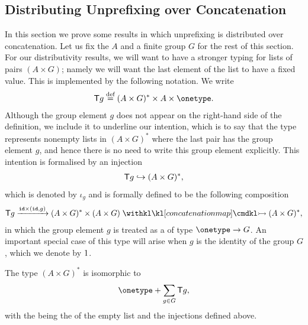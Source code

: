 \subsection{Distributing Unprefixing over Concatenation}
In this section we prove  some results in which unprefixing is distributed over concatenation. 
Let us fix the  $A$ and a finite group $G$ for the rest of this section. For our distributivity results, we will want to have a stronger typing for lists of pairs $(A \times G)$; namely we will want the last element of the list to have a fixed value. This is implemented by the following notation.
We write 
\begin{align*}
\functor g \eqdef (A \times G)^* \times A \times \onetype.
\end{align*}
Although the group element $g$ does not appear on the right-hand side of the definition, we include it to underline our intention, which is to say that the type represents nonempty lists in $(A \times G)^*$ where the last pair has the group element $g$, and hence there is no need to write this group element explicitly. This intention is formalised by an injection
\begin{align*}
\mathsf T g \hookrightarrow (A \times G)^*,
\end{align*}
which is denoted by $\iota_g$ and is formally defined  to be the following composition
\begin{align*}
\functor g \xrightarrow {\idterm \times (\idterm,g)} (A \times G)^* \times (A \times G) \concmap  (A \times G)^*,
\end{align*}
in which the group element $g$ is treated as a  of type $\onetype \to G$. An important special case of this type will arise when $g$ is the identity of the group $G$, which we denote by $1$. 




The type $(A \times G)^*$ is isomorphic to 
\begin{align*}
\onetype + \sum_{g \in G} \functor g,
\end{align*}
with the  being the  of the empty list and the injections defined above.


